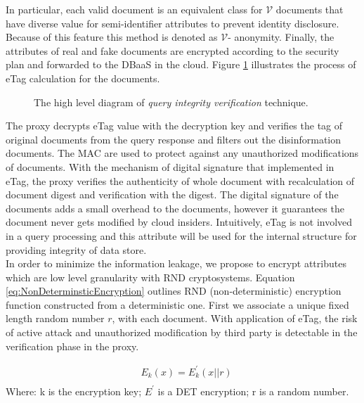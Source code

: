 In particular, each valid document is an equivalent class for $\mathcal{V}$ documents that have diverse value for semi-identifier attributes to prevent identity disclosure. Because of this feature this method is denoted as $\mathcal{V}$- anonymity. Finally, the attributes of real and fake documents are encrypted according to the security plan and forwarded to the DBaaS in the cloud. Figure \ref{fig:QueryIntegrityVerification} illustrates the process of eTag calculation for the documents.

\begin{figure}[H]
\centering
\resizebox{0.7\textwidth}{!}{}
\caption{The high level diagram of \textit{query integrity verification} technique.}
\label{fig:QueryIntegrityVerification}
\end{figure}

The proxy decrypts eTag value with the decryption key and verifies the tag of original documents from the query response and filters out the disinformation documents. The MAC are used to protect against any unauthorized modifications of documents. With the mechanism of digital signature that implemented in eTag, the proxy verifies the authenticity of whole document with recalculation of document digest and verification with the digest. The digital signature of the documents adds a small overhead to the documents, however it guarantees the document never gets modified by cloud insiders. Intuitively, eTag is not involved in a query processing and this attribute will be used for the internal structure for providing integrity of data store.\\

In order to minimize the information leakage, we propose to encrypt attributes which are low level granularity with RND cryptosystems. Equation \ref{eq:NonDeterminsticEncryption} outlines RND (non-deterministic) encryption function constructed from a deterministic one. First we associate a unique fixed length random number $r$, with each document. With application of eTag, the risk of active attack and unauthorized modification by third party is detectable in the verification phase in the proxy.


\begin{equation}
\label{eq:NonDeterminsticEncryption}
\begin{aligned}
& E_k (x) = E^{\prime}_k (x \left\lvert \right\rvert r) \\ 
\end{aligned}
\end{equation}
Where: k is the encryption key; $E^{\prime}$ is a DET encryption; r is a random number.\\

